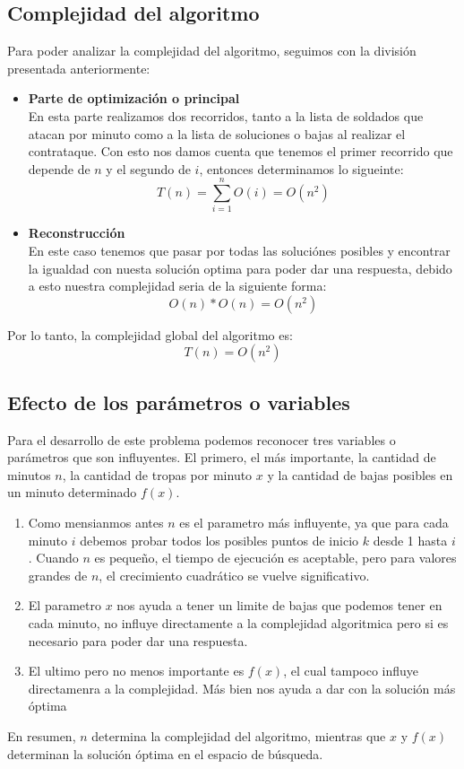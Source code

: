 \subsection{Complejidad del algoritmo}
Para poder analizar la complejidad del algoritmo, seguimos con la división presentada anteriormente:
\begin{itemize}
    \item \textbf{Parte de optimización o principal}\\
    En esta parte realizamos dos recorridos, tanto a la lista de soldados que atacan por minuto como a la lista de soluciones o bajas al realizar el contrataque. Con esto nos damos cuenta que tenemos el primer recorrido que depende de $n$ y el segundo de $i$, entonces determinamos lo sigueinte:
        \[T(n) = \sum_{i=1}^{n} O(i) = O(n^2)\]
    
    \item \textbf{Reconstrucción}\\
    En este caso tenemos que pasar por todas las soluciónes posibles y encontrar la igualdad con nuesta solución optima para poder dar una respuesta, debido a esto nuestra complejidad seria de la siguiente forma:
        \[O(n) * O(n) = O(n^2)\]
\end{itemize}

Por lo tanto, la complejidad global del algoritmo es:\[T(n) = O(n^2)\]

\subsection{Efecto de los parámetros o variables}

Para el desarrollo de este problema podemos reconocer tres variables o parámetros que son influyentes. El primero, el más importante, la cantidad de minutos $n$, la cantidad de tropas por minuto $x$ y la cantidad de bajas posibles en un minuto determinado $f(x)$.
\begin{enumerate}
    \item Como mensianmos antes $n$ es el parametro más influyente, ya que para cada minuto $i$ debemos probar todos los posibles puntos de inicio $k$ desde 1 hasta $i$. Cuando $n$ es pequeño, el tiempo de ejecución es aceptable, pero para valores grandes de $n$, el crecimiento cuadrático se vuelve significativo.
    \item El parametro $x$ nos ayuda a tener un limite de bajas que podemos tener en cada minuto, no influye directamente a la complejidad algoritmica pero si es necesario para poder dar una respuesta.
    \item El ultimo pero no menos importante es $f(x)$, el cual tampoco influye directamenra a la complejidad. Más bien nos ayuda a dar con la solución más óptima 
\end{enumerate}
En resumen, $n$ determina la complejidad del algoritmo, mientras que $x$ y $f(x)$ determinan la solución óptima en el espacio de búsqueda. 
